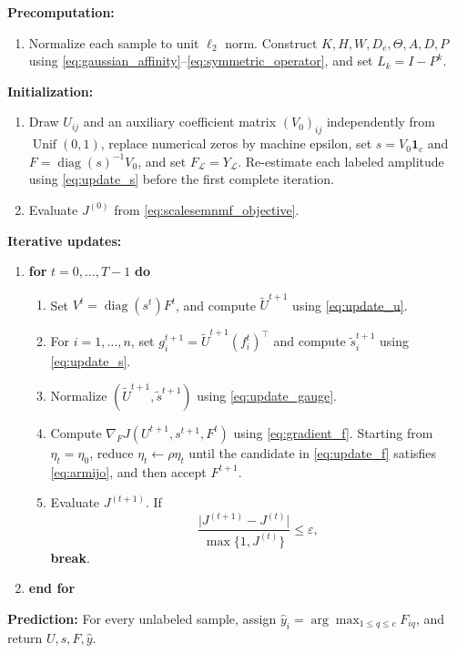 \documentclass[a4paper,preprint,12pt]{elsarticle}
\theoremstyle{remark}
\newcommand{\diag}{\operatorname{diag}}
\begin{document}
\begin{algorithm}[!htbp]
\textbf{Precomputation:}
\begin{enumerate}[label=\arabic*.,leftmargin=5mm,itemsep=1pt,topsep=1pt]
\item Normalize each sample to unit \(\ell_2\) norm. Construct \(K,H,W,D_e,\Theta,A,D,P\) using \eqref{eq:gaussian_affinity}--\eqref{eq:symmetric_operator}, and set \(L_k=I-P^k\).
\end{enumerate}
\textbf{Initialization:}
\begin{enumerate}[label=\arabic*.,leftmargin=5mm,itemsep=1pt,topsep=1pt,start=2]
\item Draw \(U_{ij}\) and an auxiliary coefficient matrix \((V_0)_{ij}\) independently from \(\operatorname{Unif}(0,1)\), replace numerical zeros by machine epsilon, set \(s=V_0\mathbf 1_c\) and \(F=\diag(s)^{-1}V_0\), and set \(F_{\mathcal L}=Y_{\mathcal L}\). Re-estimate each labeled amplitude using \eqref{eq:update_s} before the first complete iteration.
\item Evaluate \(J^{(0)}\) from \eqref{eq:scalesemnmf_objective}.
\end{enumerate}
\textbf{Iterative updates:}
\begin{enumerate}[label=\arabic*.,leftmargin=5mm,itemsep=1pt,topsep=1pt,start=4]
\item \textbf{for} \(t=0,\ldots,T-1\) \textbf{do}
\begin{enumerate}[label=\alph*.,leftmargin=5mm,itemsep=1pt,topsep=1pt]
\item Set \(V^t=\operatorname{diag}(s^t)F^t\), and compute \(\widetilde U^{t+1}\) using \eqref{eq:update_u}.
\item For \(i=1,\ldots,n\), set \(g_i^{t+1}=\widetilde U^{t+1}(f_i^t)^\top\) and compute \(\widetilde s_i^{t+1}\) using \eqref{eq:update_s}.
\item Normalize \((\widetilde U^{t+1},\widetilde s^{t+1})\) using \eqref{eq:update_gauge}.
\item Compute \(\nabla_FJ(U^{t+1},s^{t+1},F^t)\) using \eqref{eq:gradient_f}. Starting from \(\eta_t=\eta_0\), reduce \(\eta_t\leftarrow\rho\eta_t\) until the candidate in \eqref{eq:update_f} satisfies \eqref{eq:armijo}, and then accept \(F^{t+1}\).
\item Evaluate \(J^{(t+1)}\). If
\[
\frac{\lvert J^{(t+1)}-J^{(t)}\rvert}{\max\{1,J^{(t)}\}}\le\varepsilon,
\]
\textbf{break}.
\end{enumerate}
\item \textbf{end for}
\end{enumerate}
\textbf{Prediction:} For every unlabeled sample, assign
\(\widehat y_i=\arg\max_{1\le q\le c}F_{iq}\), and return \(U,s,F,\widehat y\).
\end{algorithm}
\end{document}
